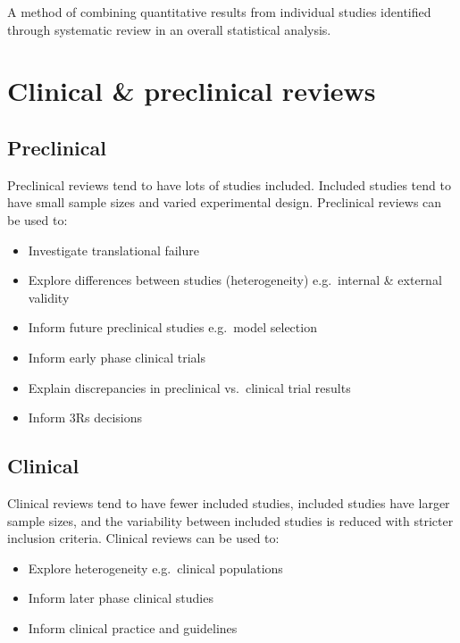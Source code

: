 \documentclass[
]{book}
\providecommand{\tightlist}{%
  \setlength{\itemsep}{0pt}\setlength{\parskip}{0pt}}
\begin{document}
A method of combining quantitative results from individual studies identified through systematic review in an overall statistical analysis.

\hypertarget{clinical-preclinical-reviews}{%
\section{Clinical \& preclinical reviews}\label{clinical-preclinical-reviews}}

\hypertarget{preclinical}{%
\subsection{Preclinical}\label{preclinical}}

Preclinical reviews tend to have lots of studies included. Included studies tend to have small sample sizes and varied experimental design.
Preclinical reviews can be used to:

\begin{itemize}
\tightlist
\item
  Investigate translational failure
\item
  Explore differences between studies (heterogeneity) e.g.~internal \& external validity
\item
  Inform future preclinical studies e.g.~model selection
\item
  Inform early phase clinical trials
\item
  Explain discrepancies in preclinical vs.~clinical trial results
\item
  Inform 3Rs decisions
\end{itemize}

\hypertarget{clinical}{%
\subsection{Clinical}\label{clinical}}

Clinical reviews tend to have fewer included studies, included studies have larger sample sizes, and the variability between included studies is reduced with stricter inclusion criteria.
Clinical reviews can be used to:

\begin{itemize}
\tightlist
\item
  Explore heterogeneity e.g.~clinical populations
\item
  Inform later phase clinical studies
\item
  Inform clinical practice and guidelines
\end{itemize}
\end{document}
